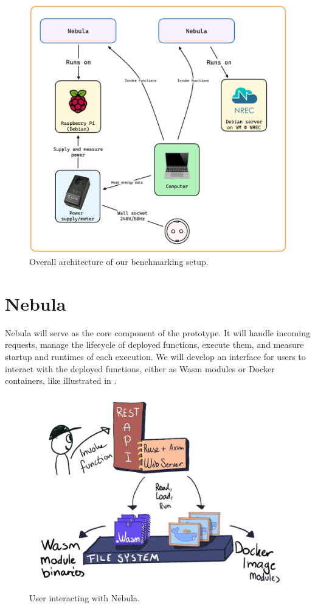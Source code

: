 \documentclass[
  table]{report}
\begin{document}
\begin{figure}[H]
\centering
  \includegraphics[width=0.6\columnwidth]{assets/5-overall-system-design.png}
  \caption{Overall architecture of our benchmarking setup.}
  \label{fig:system-design}
\end{figure}

\section{Nebula}

Nebula will serve as the core component of the prototype. It will handle
incoming requests, manage the lifecycle of deployed functions, execute
them, and measure startup and runtimes of each execution. We will
develop an interface for users to interact with the deployed functions,
either as \ac{Wasm} modules or Docker containers, like illustrated in
.

\begin{figure}[H]
\centering
  \includegraphics[width=0.6\columnwidth]{assets/user-interaction.jpg}
  \caption{User interacting with Nebula.}
  \label{fig:user-interaction}
\end{figure}
\end{document}
